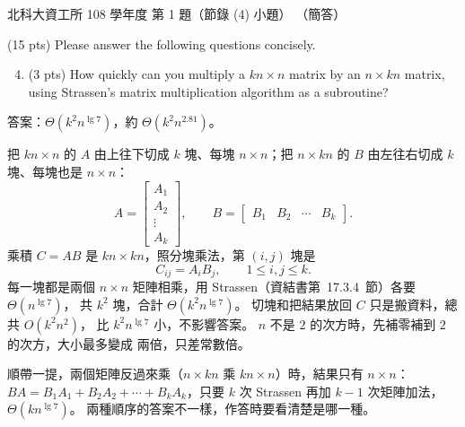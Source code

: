 \begin{pastexam}[label={px:ntut-108-ci-02}]{北科大資工所 108 學年度 第 1 題（節錄 (4) 小題）}
（簡答）

(15 pts) Please answer the following questions concisely.
\begin{enumerate}[label=(\arabic*)]
\setcounter{enumi}{3}
\item (3 pts) How quickly can you multiply a $kn\times n$ matrix by an $n\times kn$ matrix, using
Strassen's matrix multiplication algorithm as a subroutine?
\end{enumerate}
\end{pastexam}

\begin{pastsoln}
答案：$\Theta(k^2 n^{\lg 7})$，約 $\Theta(k^2 n^{2.81})$。

把 $kn \times n$ 的 $A$ 由上往下切成 $k$ 塊、每塊 $n \times n$；把 $n \times kn$ 的 $B$ 由左往右切成
$k$ 塊、每塊也是 $n \times n$：
\[
A = \begin{bmatrix} A_1 \\ A_2 \\ \vdots \\ A_k \end{bmatrix}, \qquad
B = \begin{bmatrix} B_1 & B_2 & \cdots & B_k \end{bmatrix}.
\]
乘積 $C = AB$ 是 $kn \times kn$，照分塊乘法，第 $(i, j)$ 塊是
\[
C_{ij} = A_i B_j, \qquad 1 \le i, j \le k .
\]
每一塊都是兩個 $n \times n$ 矩陣相乘，用 Strassen（資結書第~17.3.4~節）各要 $\Theta(n^{\lg 7})$，
共 $k^2$ 塊，合計 $\Theta(k^2 n^{\lg 7})$。 切塊和把結果放回 $C$ 只是搬資料，總共 $O(k^2 n^2)$，
比 $k^2 n^{\lg 7}$ 小，不影響答案。 $n$ 不是 $2$ 的次方時，先補零補到 $2$ 的次方，大小最多變成
兩倍，只差常數倍。

順帶一提，兩個矩陣反過來乘（$n \times kn$ 乘 $kn \times n$）時，結果只有 $n \times n$：
$BA = B_1 A_1 + B_2 A_2 + \cdots + B_k A_k$，只要 $k$ 次 Strassen 再加 $k - 1$ 次矩陣加法，
$\Theta(k n^{\lg 7})$。 兩種順序的答案不一樣，作答時要看清楚是哪一種。
\end{pastsoln}
